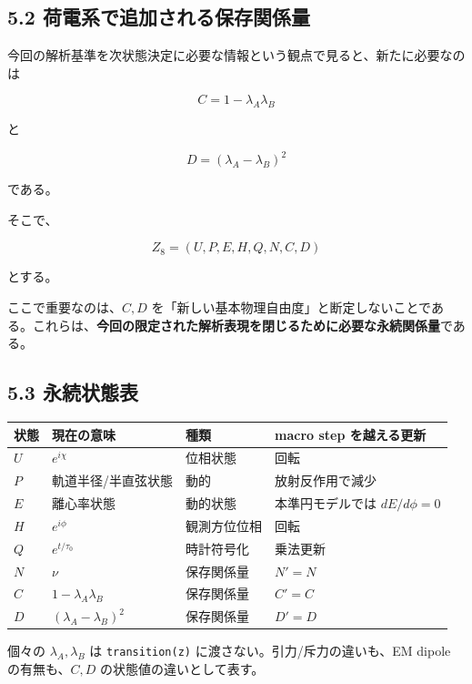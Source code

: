 \documentclass[
  a4paper,
]{ltjsarticle}
\newcounter{none} %
\begin{document}
\subsection{5.2
荷電系で追加される保存関係量}\label{ux8377ux96fbux7cfbux3067ux8ffdux52a0ux3055ux308cux308bux4fddux5b58ux95a2ux4fc2ux91cf}

今回の解析基準を次状態決定に必要な情報という観点で見ると、新たに必要なのは

\[
C=1-\lambda_A\lambda_B
\]

と

\[
D=(\lambda_A-\lambda_B)^2
\]

である。

そこで、

\[
\boxed{
Z_8=(U,P,E,H,Q,N,C,D)
}
\]

とする。

ここで重要なのは、\(C,D\)
を「新しい基本物理自由度」と断定しないことである。これらは、\textbf{今回の限定された解析表現を閉じるために必要な永続関係量}である。

\subsection{5.3 永続状態表}\label{ux6c38ux7d9aux72b6ux614bux8868}

{\def\LTcaptype{none} %
\begin{longtable}[]{@{}llll@{}}
\toprule\noalign{}
状態 & 現在の意味 & 種類 & macro step を越える更新 \\
\midrule\noalign{}
\endhead
\bottomrule\noalign{}
\endlastfoot
\(U\) & \(e^{i\chi}\) & 位相状態 & 回転 \\
\(P\) & 軌道半径/半直弦状態 & 動的 & 放射反作用で減少 \\
\(E\) & 離心率状態 & 動的状態 & 本準円モデルでは \(dE/d\phi=0\) \\
\(H\) & \(e^{i\phi}\) & 観測方位位相 & 回転 \\
\(Q\) & \(e^{t/\tau_0}\) & 時計符号化 & 乗法更新 \\
\(N\) & \(\nu\) & 保存関係量 & \(N'=N\) \\
\(C\) & \(1-\lambda_A\lambda_B\) & 保存関係量 & \(C'=C\) \\
\(D\) & \((\lambda_A-\lambda_B)^2\) & 保存関係量 & \(D'=D\) \\
\end{longtable}
}

個々の \(\lambda_A,\lambda_B\) は \texttt{transition(z)}
に渡さない。引力/斥力の違いも、EM dipole の有無も、\(C,D\)
の状態値の違いとして表す。
\end{document}
